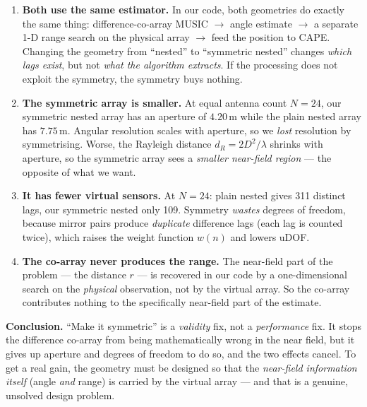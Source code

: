 \documentclass[11pt]{article}
\begin{document}
\begin{enumerate}
\item \textbf{Both use the same estimator.} In our code, both geometries do exactly the same thing:
difference-co-array MUSIC $\rightarrow$ angle estimate $\rightarrow$ a separate 1-D range search on
the physical array $\rightarrow$ feed the position to CAPE. Changing the geometry from ``nested'' to
``symmetric nested'' changes \emph{which lags exist}, but not \emph{what the algorithm extracts}. If
the processing does not exploit the symmetry, the symmetry buys nothing.

\item \textbf{The symmetric array is smaller.} At equal antenna count $N=24$, our symmetric nested
array has an aperture of $4.20$\,m while the plain nested array has $7.75$\,m. Angular resolution
scales with aperture, so we \emph{lost} resolution by symmetrising. Worse, the Rayleigh distance
$d_R = 2D^2/\lambda$ shrinks with aperture, so the symmetric array sees a \emph{smaller near-field
region} --- the opposite of what we want.

\item \textbf{It has fewer virtual sensors.} At $N=24$: plain nested gives 311 distinct lags, our
symmetric nested only 109. Symmetry \emph{wastes} degrees of freedom, because mirror pairs produce
\emph{duplicate} difference lags (each lag is counted twice), which raises the weight function
$w(n)$ and lowers uDOF.

\item \textbf{The co-array never produces the range.} The near-field part of the problem --- the
distance $r$ --- is recovered in our code by a one-dimensional search on the \emph{physical}
observation, not by the virtual array. So the co-array contributes nothing to the specifically
near-field part of the estimate.
\end{enumerate}

\begin{warnbox}
\textbf{Conclusion.} ``Make it symmetric'' is a \emph{validity} fix, not a \emph{performance} fix. It
stops the difference co-array from being mathematically wrong in the near field, but it gives up
aperture and degrees of freedom to do so, and the two effects cancel. To get a real gain, the
geometry must be designed so that the \emph{near-field information itself} (angle \emph{and} range)
is carried by the virtual array --- and that is a genuine, unsolved design problem.
\end{warnbox}
\end{document}
